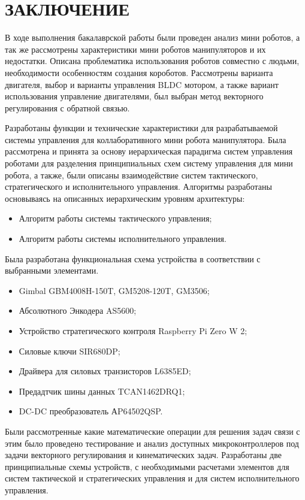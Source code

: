 
\section*{\centering ЗАКЛЮЧЕНИЕ}

В ходе выполнения бакалаврской работы были проведен анализ мини роботов, а так же рассмотрены характеристики  мини роботов манипуляторов и их недостатки. Описана проблематика использования роботов совместно с людьми, необходимости особенностям создания короботов. 
Рассмотрены варианта двигателя, выбор и варианты управления BLDC мотором, а также вариант использования управление двигателями, был выбран метод векторного регулирования с обратной связью.

Разработаны функции и технические характеристики для разрабатываемой системы управления для коллаборативного мини робота манипулятора. Была рассмотрена и принята за основу иерархическая парадигма систем управления роботами для разделения принципиальных схем систему управления для мини робота, а также, были описаны взаимодействие систем тактического, стратегического и исполнительного управления. 
Алгоритмы разработаны основываясь на описанных иерархическим уровням архитектуры:
\begin{itemize}
	\item Алгоритм работы системы тактического управления; 
	\item Алгоритм работы системы исполнительного управления.
\end{itemize}
Была разработана функциональная схема устройства в соответствии с выбранными элементами.
\begin{itemize}
	\item Gimbal GBM4008H-150T, GM5208-120T, GM3506;
	\item Абсолютного Энкодера AS5600;
	\item Устройство стратегического контроля Raspberry Pi Zero W 2;
	\item Силовые ключи SIR680DP;
	\item Драйвера для силовых транзисторов L6385ED;
	\item Предадтчик шины данных TCAN1462DRQ1;
	\item DC-DC преобразователь АP64502QSP.
\end{itemize}
Были рассмотренные какие математические операции для решения задач связи с этим было проведено тестирование и анализ доступных микроконтроллеров под задачи векторного регулирования и кинематических задач. Разработаны две принципиальные схемы устройств, с необходимыми расчетами элементов для систем тактической и стратегических управления и для систем исполнительного управления.
